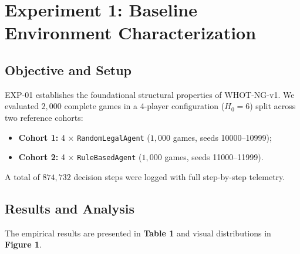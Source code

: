 \documentclass[11pt]{article}
\begin{document}
\section{Experiment 1: Baseline Environment Characterization}

\subsection{Objective and Setup}
EXP-01 establishes the foundational structural properties of WHOT-NG-v1. We evaluated $2,000$ complete games in a 4-player configuration ($H_0 = 6$) split across two reference cohorts:
\begin{itemize}
  \item \textbf{Cohort 1:} 4 $\times$ \texttt{RandomLegalAgent} ($1,000$ games, seeds 10000--10999);
  \item \textbf{Cohort 2:} 4 $\times$ \texttt{RuleBasedAgent} ($1,000$ games, seeds 11000--11999).
\end{itemize}

A total of $874,732$ decision steps were logged with full step-by-step telemetry.

\subsection{Results and Analysis}
The empirical results are presented in \textbf{Table 1} and visual distributions in \textbf{Figure 1}.
\end{document}
